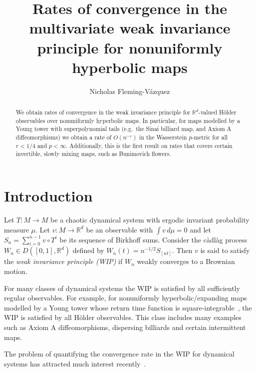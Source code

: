 \documentclass[11pt,a4paper,reqno,oneside]{amsart}
\author{Nicholas Fleming-Vázquez}
\title[Rates in the multivariate WIP for nonuniformly hyperbolic maps]{Rates of convergence in the multivariate weak invariance principle for nonuniformly hyperbolic maps}
\newcommand{\R}{\ensuremath{\mathbb{R}}}%
\theoremstyle{definition}
\theoremstyle{remark}
\numberwithin{equation}{section}
\begin{document}

\date{}

\dedicatory{}

	\begin{abstract}
		We obtain rates of convergence in the weak invariance principle for $\R^d$-valued H\"older observables over nonuniformly hyperbolic maps. In particular, for maps modelled by a Young tower with superpolynomial tails (e.g.\ the Sinai billiard map, and Axiom A diffeomorphisms) we obtain a rate of $O(n^{-r})$ in the Wasserstein $p$-metric for all $r<1/4$ and $p<\infty$. Additionally, this is the first result on rates that covers certain invertible, slowly mixing maps, such as Bunimovich flowers.
	\end{abstract}
    \maketitle
	\section{Introduction}
Let $T:M\to M$ be a chaotic dynamical system with ergodic invariant probability measure $\mu$. Let $v:M\to \R^d$ be an observable with $\int v\, d\mu = 0 $ and let $S_n = \sum_{i=0}^{n-1}{v\circ T^i}$ be its sequence of Birkhoff sums. Consider the c\`adl\`ag process $W_n \in D([0,1],\R^d)$ defined by $W_n(t) = n^{-1/2} S_{[nt]}$. Then $v$ is said to satisfy the \textit{weak invariance principle (WIP)} if $W_n$ weakly converges to a Brownian motion. 

For many classes of dynamical systems the WIP is satisfied by all sufficiently regular observables. For example, for nonuniformly hyperbolic/expanding maps modelled by a Young tower whose return time function is square-integrable~\cite{young1998statistical,young1999recurrence}, the WIP is satisfied by all H\"older observables. This class includes many examples such as Axiom A diffeomorphisms, dispersing billiards and certain intermittent maps.

The problem of quantifying the convergence rate in the WIP for dynamical systems has attracted much interest recently~\cite{antoniou_melbourne,dedecker_merlevede_rio,liu_wang_stationary,liu_wang_sequential,paviato_rates_article,leppanen_nakajima_nakano,liu_saussol_vaienti_wang,melbourne_wang}. 
\end{document}
